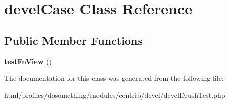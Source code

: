 \hypertarget{classdevelCase}{
\section{develCase Class Reference}
\label{classdevelCase}
}
\subsection*{Public Member Functions}
\begin{DoxyCompactItemize}
\item 
\hypertarget{classdevelCase_ade265b9b589ff41bd9cd09ded48d0149}{
{\bfseries testFnView} ()}
\label{classdevelCase_ade265b9b589ff41bd9cd09ded48d0149}

\end{DoxyCompactItemize}


The documentation for this class was generated from the following file:\begin{DoxyCompactItemize}
\item 
html/profiles/dosomething/modules/contrib/devel/develDrushTest.php\end{DoxyCompactItemize}
